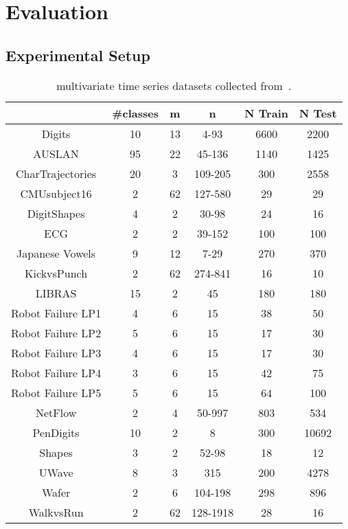\documentclass[sigconf]{acmart}
\begin{document}
\section{Evaluation}\label{sec:Results}
\subsection{Experimental Setup}

\begin{table}[t]
	\begin{centering}
		\begin{tabular}{cccccc}
			& {\#classes} & {m} & {n} & {N Train} & {N Test}\tabularnewline
			\midrule 
			\midrule 
			{Digits} & {10} & {13} & {4-93} & {6600} & {2200}\tabularnewline
			\midrule 
			{AUSLAN} & {95} & {22} & {45-136} & {1140} & {1425}\tabularnewline
			\midrule 
			{CharTrajectories} & {20} & {3} & {109-205} & {300} & {2558}\tabularnewline
			\midrule 
			{CMUsubject16} & {2} & {62} & {127-580} & {29} & {29}\tabularnewline
			\midrule 
			{DigitShapes} & 4 & {2} & {30-98} & {24} & {16}\tabularnewline
			\midrule 
			{ECG} & {2} & {2} & {39-152} & {100} & {100}\tabularnewline
			\midrule 
			{Japanese Vowels} & {9} & {12} & {7-29} & {270} & {370}\tabularnewline
			\midrule 
			{KickvsPunch} & {2} & {62} & {274-841} & {16} & {10}\tabularnewline
			\midrule 
			{LIBRAS} & {15} & {2} & {45} & {180} & {180}\tabularnewline
			\midrule 
			{Robot Failure LP1} & {4} & {6} & {15} & {38} & {50}\tabularnewline
			\midrule 
			{Robot Failure LP2} & {5} & {6} & {15} & {17} & {30}\tabularnewline
			\midrule 
			{Robot Failure LP3} & {4} & {6} & {15} & {17} & {30}\tabularnewline
			\midrule 
			{Robot Failure LP4} & {3} & {6} & {15} & {42} & {75}\tabularnewline
			\midrule 
			{Robot Failure LP5} & {5} & {6} & {15} & {64} & {100}\tabularnewline
			\midrule 
			{NetFlow} & {2} & {4} & {50-997} & {803} & {534}\tabularnewline			
			\midrule 
			{PenDigits} & {10} & {2} & {8} & {300} & {10692}\tabularnewline
			\midrule 
			{Shapes} & {3} & {2} & {52-98} & {18} & {12}\tabularnewline
			\midrule 			
			{UWave} & {8} & {3} & {315} & {200} & {4278}\tabularnewline
			\midrule 
			{Wafer} & {2} & {6} & {104-198} & {298} & {896}\tabularnewline
			\midrule 
			{WalkvsRun} & {2} & {62} & {128-1918} & {28} & {16}\tabularnewline
		\end{tabular}
		\par\end{centering}
	\caption{ multivariate time series datasets collected from~\cite{MultivariateTimeSeriesClassification}. \label{tab:Datasets}}
	
\end{table}
\end{document}
